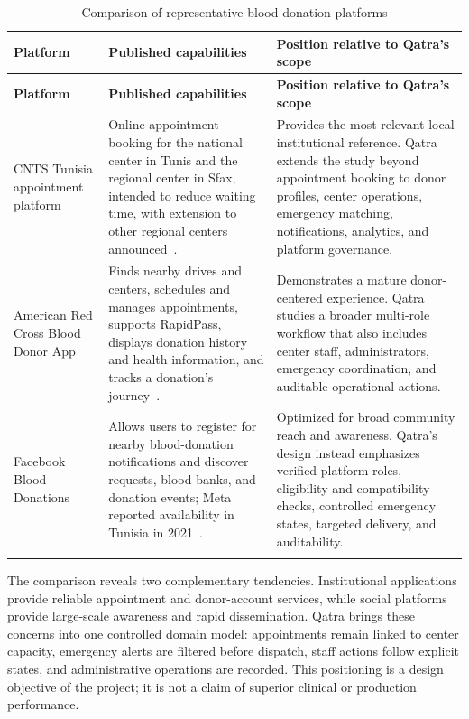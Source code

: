 \begin{longtable}{|P{3.0cm}|P{5.0cm}|P{5.4cm}|}
\hline
{}\textbf{Platform} & \textbf{Published capabilities} & \textbf{Position relative to Qatra's scope}\\ \hline
\endfirsthead
\hline
{}\textbf{Platform} & \textbf{Published capabilities} & \textbf{Position relative to Qatra's scope}\\ \hline
\endhead
CNTS Tunisia appointment platform & Online appointment booking for the national center in Tunis and the regional center in Sfax, intended to reduce waiting time, with extension to other regional centers announced~\cite{cntsplatform}. & Provides the most relevant local institutional reference. Qatra extends the study beyond appointment booking to donor profiles, center operations, emergency matching, notifications, analytics, and platform governance.\\ \hline
American Red Cross Blood Donor App & Finds nearby drives and centers, schedules and manages appointments, supports RapidPass, displays donation history and health information, and tracks a donation's journey~\cite{redcrossapp}. & Demonstrates a mature donor-centered experience. Qatra studies a broader multi-role workflow that also includes center staff, administrators, emergency coordination, and auditable operational actions.\\ \hline
Facebook Blood Donations & Allows users to register for nearby blood-donation notifications and discover requests, blood banks, and donation events; Meta reported availability in Tunisia in 2021~\cite{facebookblood}. & Optimized for broad community reach and awareness. Qatra's design instead emphasizes verified platform roles, eligibility and compatibility checks, controlled emergency states, targeted delivery, and auditability.\\ \hline
\caption{Comparison of representative blood-donation platforms}
\label{tab:existing-platforms}
\end{longtable}

The comparison reveals two complementary tendencies. Institutional applications provide reliable appointment and donor-account services, while social platforms provide large-scale awareness and rapid dissemination. Qatra brings these concerns into one controlled domain model: appointments remain linked to center capacity, emergency alerts are filtered before dispatch, staff actions follow explicit states, and administrative operations are recorded. This positioning is a design objective of the project; it is not a claim of superior clinical or production performance.

